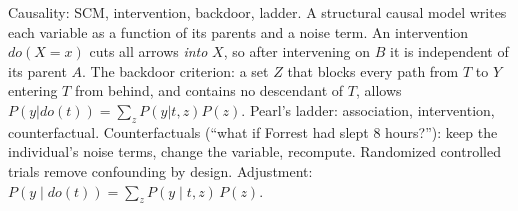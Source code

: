 \begin{qabox}[Holzleitner]{\cexam Causality: SCM, intervention, backdoor, ladder.}
\ans A structural causal model writes each variable as a function of its parents and a noise term.
An intervention $do(X=x)$ cuts all arrows \emph{into} $X$, so after intervening on $B$ it is
independent of its parent $A$. The backdoor criterion: a set $Z$ that blocks every path from $T$ to
$Y$ entering $T$ from behind, and contains no descendant of $T$, allows
$P(y|do(t))=\sum_zP(y|t,z)P(z)$. Pearl's ladder: association, intervention, counterfactual.
Counterfactuals (``what if Forrest had slept 8 hours?''): keep the individual's noise terms, change
the variable, recompute. Randomized controlled trials remove confounding by design.
\formula Adjustment: $P(y\mid do(t))=\sum_zP(y\mid t,z)\,P(z)$.
\end{qabox}
